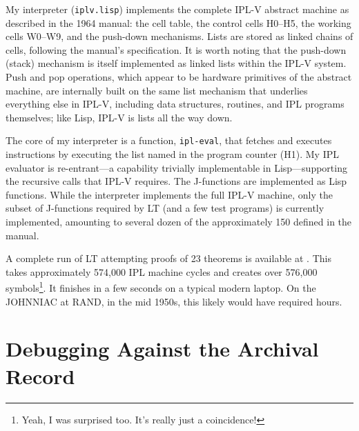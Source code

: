 \documentclass[journal]{IEEEtran}
\begin{document}
My interpreter (\texttt{iplv.lisp}) implements the complete IPL-V
abstract machine as described in the 1964 manual: the cell table, the
control cells H0--H5, the working cells W0--W9, and the push-down
mechanisms. Lists are stored as linked chains of cells, following the
manual's specification. It is worth noting that the push-down (stack)
mechanism is itself implemented as linked lists within the IPL-V
system. Push and pop operations, which appear to be hardware
primitives of the abstract machine, are internally built on the same
list mechanism that underlies everything else in IPL-V, including data
structures, routines, and IPL programs themselves; like Lisp, IPL-V is
lists all the way down.

The core of my interpreter is a function, \texttt{ipl-eval}, that
fetches and executes instructions by executing the list named in the
program counter (H1). My IPL evaluator is re-entrant---a capability
trivially implementable in Lisp---supporting the recursive calls that
IPL-V requires. The J-functions are implemented as Lisp
functions. While the interpreter implements the full IPL-V machine,
only the subset of J-functions required by LT (and a few test
programs) is currently implemented, amounting to several dozen of the
approximately 150 defined in the manual.

A complete run of LT attempting proofs of 23 theorems is available at
\cite{runoutput}. This takes approximately 574,000 IPL machine cycles
and creates over 576,000 symbols\footnote{Yeah, I was surprised
too. It's really just a coincidence!}. It finishes in a few seconds on
a typical modern laptop. On the JOHNNIAC at RAND, in the mid 1950s,
this likely would have required hours.

\section{Debugging Against the Archival Record}
\label{sec:debugging}

\end{document}
